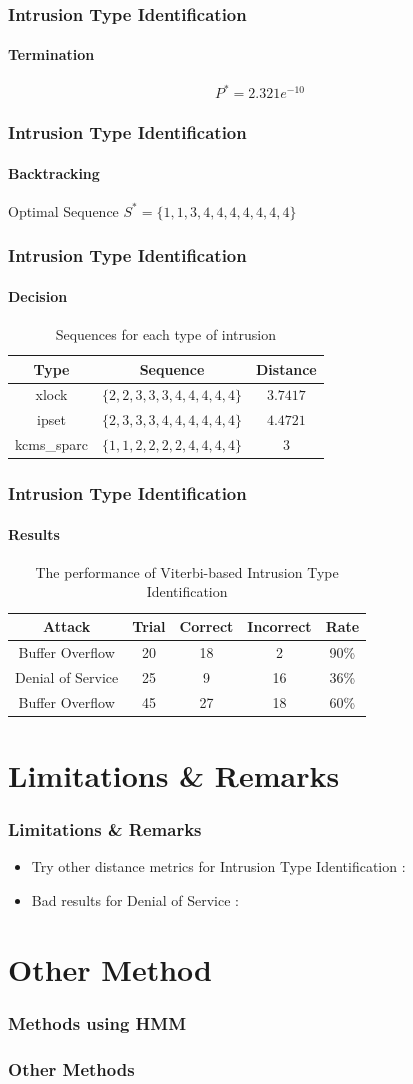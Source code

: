 \documentclass{beamer}
\renewcommand{\footfullcite}[1]{\footnote[frame]{\fullcite{#1}}}
\begin{document}
  \begin{frame}
  \frametitle{Intrusion Type Identification}
  \framesubtitle{Termination}
  $$
  P^{*} = 2.321e^{-10}
  $$
\end{frame}
\begin{frame}
  \frametitle{Intrusion Type Identification}
  \framesubtitle{Backtracking}
  Optimal Sequence $ S^{*} = \{1,1,3,4,4,4,4,4,4,4\}$
\end{frame}
\begin{frame}
  \frametitle{Intrusion Type Identification}
  \framesubtitle{Decision}
  \begin{table}
    \caption{\label{tab:type}Sequences for each type of intrusion}
    \begin{tabular}{|c|c|c|}
      \hline
      Type & Sequence & Distance \\ \hline
      xlock & $\{2,2,3,3,3,4,4,4,4,4\}$ & $3.7417$ \\ \hline
      ipset & $\{2,3,3,3,4,4,4,4,4,4\}$ & $4.4721$ \\ \hline
      kcms\_sparc & $\{1,1,2,2,2,2,4,4,4,4\}$ & $3$ \\ \hline
    \end{tabular}
  \end{table}
\end{frame}
\begin{frame}
  \frametitle{Intrusion Type Identification}
  \framesubtitle{Results}
  \begin{table}[h]
    \centering
    \caption{\label{tab:IDS}The performance of Viterbi-based Intrusion
      Type Identification}
    \begin{tabular}{|c| c|c | c | c |}
      \hline
      Attack & Trial & Correct & Incorrect & Rate \\ \hline
      Buffer Overflow & 20 & 18 & 2 & 90\% \\ \hline
      Denial of Service & 25 & 9 & 16 & 36\% \\ \hline
      Buffer Overflow & 45 & 27 & 18 & 60\% \\ \hline
    \end{tabular}
  \end{table}    
\end{frame}

\section{Limitations \& Remarks}
\begin{frame}
  \frametitle{Limitations \& Remarks}
  \begin{itemize}
  \item Try other distance metrics for Intrusion Type Identification :
    \pause
  \item Bad results for Denial of Service :
  \end{itemize}
\end{frame}

\section{Other Method}
\begin{frame}
  \frametitle{Methods using HMM}
\end{frame}

\begin{frame}
  \frametitle{Other Methods}
\end{frame}
\end{document}
